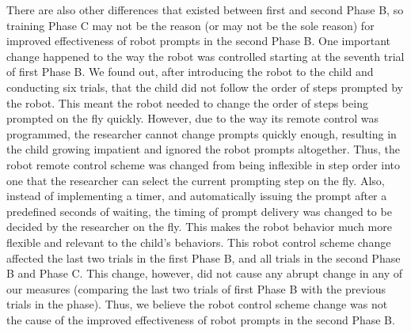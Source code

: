 There are also other differences that existed between first and second Phase B, so training Phase C may not be the reason (or may not be the sole reason) for improved effectiveness of robot prompts in the second Phase B.  One important change happened to the way the robot was controlled starting at the seventh trial of first Phase B.  We found out, after introducing the robot to the child and conducting six trials, that the child did not follow the order of steps prompted by the robot.  This meant the robot needed to change the order of steps being prompted on the fly quickly.  However, due to the way its remote control was programmed, the researcher cannot change prompts quickly enough, resulting in the child growing impatient and ignored the robot prompts altogether.  Thus, the robot remote control scheme was changed from being inflexible in step order into one that the researcher can select the current prompting step on the fly.  Also, instead of implementing a timer, and automatically issuing the prompt after a predefined seconds of waiting, the timing of prompt delivery was changed to be decided by the researcher on the fly.  This makes the robot behavior much more flexible and relevant to the child's behaviors.  This robot control scheme change affected the last two trials in the first Phase B, and all trials in the second Phase B and Phase C.  This change, however, did not cause any abrupt change in any of our measures (comparing the last two trials of first Phase B with the previous trials in the phase).  Thus, we believe the robot control scheme change was not the cause of the improved effectiveness of robot prompts in the second Phase B.

